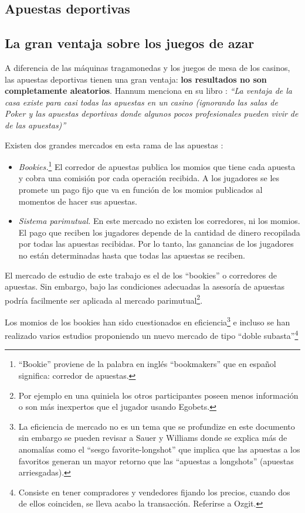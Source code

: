 \subsection{Apuestas deportivas}

\subsection{La gran ventaja sobre los juegos de azar}

A diferencia de las máquinas tragamonedas y los juegos de mesa de los casinos, las apuestas deportivas tienen una gran ventaja: \textbf{los resultados no son completamente aleatorios}. Hannum menciona en su libro \cite{hannum2005practical} : \emph{``La ventaja de la casa existe para casi todas las apuestas en un casino (ignorando las salas de Poker y las apuestas deportivas donde algunos pocos profesionales pueden vivir de de las apuestas)''}  

Existen dos grandes mercados en esta rama de las apuestas \cite{chung2010empirical}:
\begin{itemize} 
	\item \emph{Bookies.}\footnote{``Bookie'' proviene de la palabra en inglés ``bookmakers'' que en español significa: corredor de apuestas.} El corredor de apuestas publica los momios que tiene cada apuesta y cobra una comisión por cada operación recibida. A los jugadores se les promete un pago fijo que va en función de los momios publicados al momentos de hacer sus apuestas.
	\item \emph{Sistema parimutual.} En este mercado no existen los corredores, ni los momios. El pago que reciben los jugadores depende de la cantidad de dinero recopilada por todas las apuestas recibidas. Por lo tanto, las ganancias de los jugadores no están determinadas hasta que todas las apuestas se reciben.
	\end{itemize}

El mercado de estudio de este trabajo es el de los ``bookies'' o corredores de apuestas. Sin embargo, bajo las condiciones adecuadas la asesoría de apuestas podría facilmente ser aplicada al mercado parimutual\footnote{Por ejemplo en una quiniela los otros participantes poseen menos información o son más inexpertos que el jugador usando Egobets.}.

Los momios de los bookies han sido cuestionados en eficiencia\footnote{La eficiencia de mercado no es un tema que se profundize en este documento sin embargo se pueden revisar a Sauer \cite{sauer1998economics} y Williams \cite{williams1999information} donde se explica más de anomalías como el ``sesgo favorite-longshot'' que implica que las apuestas a los favoritos generan un mayor retorno que las ``apuestas a longshots'' (apuestas arriesgadas).} e incluso se han realizado varios estudios proponiendo un nuevo mercado de tipo ``doble subasta''\footnote{Consiste en tener compradores y vendedores fijando los precios, cuando dos de ellos coinciden, se lleva acabo la transacción. Referirse a Ozgit\cite{ozgit2005posted}.}

